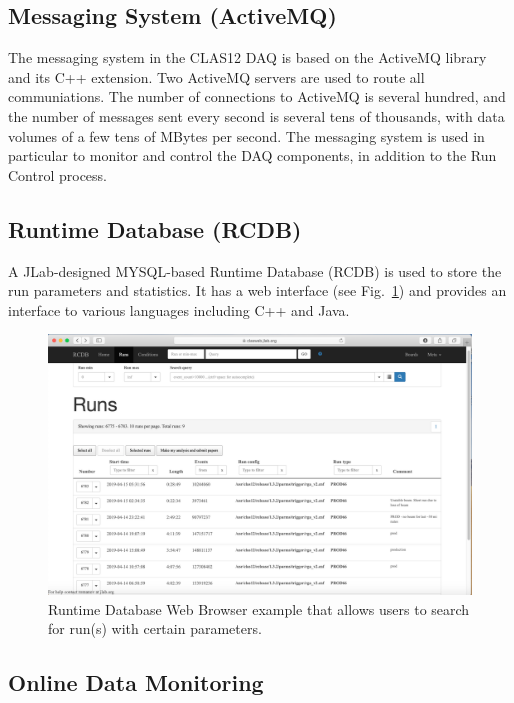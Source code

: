 \subsection{Messaging System (ActiveMQ)}

The messaging system in the CLAS12 DAQ is based on the ActiveMQ library and its C++ extension. Two ActiveMQ servers are used to route all communiations. The number of connections to ActiveMQ is several hundred, and the number of messages sent every second is several tens of thousands, with data volumes of a few tens of MBytes per second. The messaging system is used in particular to monitor and control the DAQ components, in addition to the Run Control process.


\subsection{Runtime Database (RCDB)}

A JLab-designed MYSQL-based Runtime Database (RCDB) is used to store the run parameters and statistics. It has a web interface (see Fig.~\ref{fig:rcdb}) and provides an interface to various languages including C++ and Java.

\begin{figure}[hbt]
	\centering
	\includegraphics[width=\textwidth]{img/rcdb.png}
	\caption{Runtime Database Web Browser example that allows users to search for run(s) with certain parameters.}
	\label{fig:rcdb}
\end{figure}

\subsection{Online Data Monitoring}

